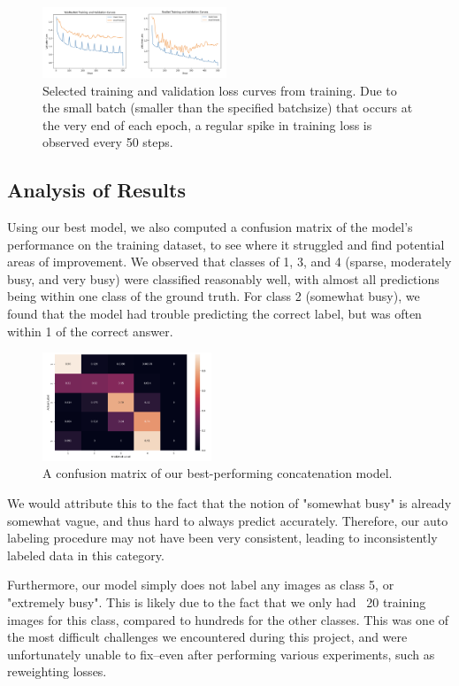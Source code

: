 \documentclass{article}
\begin{document}
\begin{multicols}{2}
\begin{figure}[H]
  \centering
  \includegraphics[width=0.49\textwidth]{trainingcurves.png}
  \caption{Selected training and validation loss curves from training. Due to the small batch (smaller than the specified batchsize) that occurs at the very end of each epoch, a regular spike in training loss is observed every 50 steps.}
  \label{fig:fig6}
\end{figure}

\subsection*{Analysis of Results}


Using our best model, we also computed a confusion matrix of the model's performance on the training dataset, to see where it struggled and find potential areas of improvement. We observed that classes of 1, 3, and 4 (sparse, moderately busy, and very busy) were classified reasonably well, with almost all predictions being within one class of the ground truth. For class 2 (somewhat busy), we found that the model had trouble predicting the correct label, but was often within 1 of the correct answer. 

\begin{figure}[H]
  \centering
  \includegraphics[width=0.45\textwidth]{confusionMatrix.png}
  \caption{A confusion matrix of our best-performing concatenation model.}
  \label{fig:fig7}
\end{figure}


We would attribute this to the fact that the notion of "somewhat busy" is already somewhat vague, and thus hard to always predict accurately. Therefore, our auto labeling procedure may not have been very consistent, leading to inconsistently labeled data in this category. 
  
Furthermore, our model simply does not label any images as class 5, or "extremely busy". This is likely due to the fact that we only had ~20 training images for this class, compared to hundreds for the other classes. This was one of the most difficult challenges we encountered during this project, and were unfortunately unable to fix–even after performing various experiments, such as reweighting losses.

\end{multicols}
\end{document}
